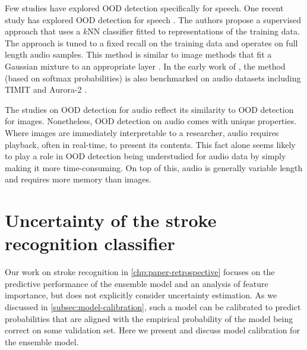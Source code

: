 Few studies have explored OOD detection specifically for speech. One recent study has explored OOD detection for speech \parencite{bukhsh_outofdistribution_2023}. The authors propose a supervised approach that uses a $k$NN classifier fitted to representations of the training data. The approach is tuned to a fixed recall on the training data and operates on full length audio samples. This method is similar to image methods that fit a Gaussian mixture to an appropriate layer \parencite{lee_simple_2018, xiao_we_2021}. In the early work of \textcite{hendrycks_baseline_2017}, the method (based on softmax probabilities) is also benchmarked on audio datasets including TIMIT and Aurora-2 \parencite{garofolo_timit_1993,pearce_aurora_2000}. 

The studies on OOD detection for audio reflect its similarity to OOD detection for images. 
Nonetheless, OOD detection on audio comes with unique properties. Where images are immediately interpretable to a researcher, audio requires playback, often in real-time, to present its contents. This fact alone seems likely to play a role in OOD detection being understudied for audio data by simply making it more time-consuming. On top of this, audio is generally variable length and requires more memory than images. 









\section{Uncertainty of the stroke recognition classifier} \label{sec: discussion-stroke-recognition-uncertainty}

Our work on stroke recognition in \cref{chp:paper-retrospective} focuses on the predictive performance of the ensemble model and an analysis of feature importance, but does not explicitly consider uncertainty estimation. 
As we discussed in \cref{subsec:model-calibration}, such a model can be calibrated to predict probabilities that are aligned with the empirical probability of the model being correct on some validation set. Here we present and discuss model calibration for the ensemble model. 

